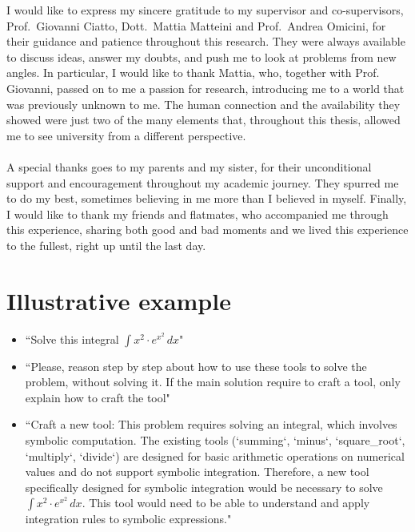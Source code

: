 \documentclass[12pt,a4paper,openright,twoside]{book}
\begin{document}
\begin{acknowledgements} %
I would like to express my sincere gratitude to my supervisor and co-supervisors, Prof.~Giovanni Ciatto, Dott.~Mattia Matteini and Prof.~Andrea Omicini, for their guidance and patience throughout this research. They were always available to discuss ideas, answer my doubts, and push me to look at problems from new angles. 
In particular, I would like to thank Mattia, who, together with Prof. Giovanni, passed on to me a passion for research, introducing me to a world that was previously unknown to me. The human connection and the availability they showed were just two of the many elements that, throughout this thesis, allowed me to see university from a different perspective.
\\\\
A special thanks goes to my parents and my sister, for their unconditional support and encouragement throughout my academic journey. They spurred me to do my best, sometimes believing in me more than I believed in myself.
Finally, I would like to thank my friends and flatmates, who accompanied me through this experience, sharing both good and bad moments and we lived this experience to the fullest, right up until the last day.
\end{acknowledgements}

\appendix

\chapter{Illustrative example}\label{appendix:illustrative-example}
\begin{itemize}
    \item[\textbf{User:}] ``Solve this integral $\int x^2 \cdot e^{x^2} \, dx$"
    \item[\textbf{Node Prompt:}] ``Please, reason step by step about how to use these tools to solve the problem, without solving it. If the main solution require to craft a tool, only explain how to craft the tool"
    \item[\textbf{AI:}] ``Craft a new tool: This problem requires solving an integral, which involves symbolic computation. The existing tools (`summing`, `minus`, `square\_root`, `multiply`, `divide`) are designed for basic arithmetic operations on numerical values and do not support symbolic integration. Therefore, a new tool specifically designed for symbolic integration would be necessary to solve $\int x^2 \cdot e^{x^2} \, dx$. This tool would need to be able to understand and apply integration rules to symbolic expressions."
\end{itemize}
\end{document}
